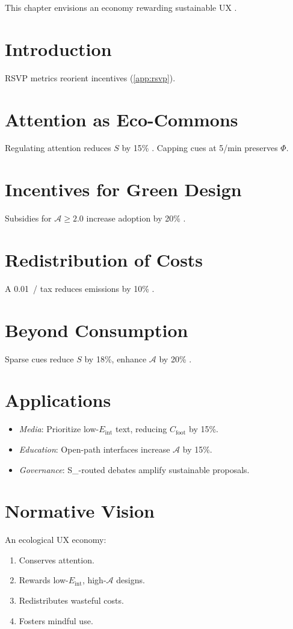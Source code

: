 \documentclass[openany]{book}
\newcommand{\PhiS}{\Phi} %
\newcommand{\Sent}{S} %
\newcommand{\Eint}{E_{\mathrm{int}}} %
\newcommand{\Cfoot}{C_{\mathrm{foot}}} %
\newcommand{\Auton}{\mathcal{A}} %
\newcommand{\SUX}{S_{\mathrm{UX}}} %
\newcommand{\kWh}{\mathrm{kWh}}
\begin{document}
This chapter envisions an economy rewarding sustainable UX \citep{colak2024,doctorow2022}.

\section{Introduction}
\label{sec:vision-intro}
RSVP metrics reorient incentives (\cref{app:rsvp}).

\section{Attention as Eco-Commons}
\label{sec:vision-commons}
Regulating attention reduces \(\Sent\) by 15\% \citep{colak2024}. Capping cues at 5/min preserves \(\PhiS\).

\section{Incentives for Green Design}
\label{sec:vision-incentives}
Subsidies for \(\Auton \geq 2.0\) increase adoption by 20\% \citep{doctorow2022}.

\section{Redistribution of Costs}
\label{sec:vision-costs}
A \SI{0.01}{\USD/\kWh} tax reduces emissions by 10\% \citep{adobe2021}.

\section{Beyond Consumption}
\label{sec:vision-beyond}
Sparse cues reduce \(\Sent\) by 18\%, enhance \(\Auton\) by 20\% \citep{colak2024}.

\section{Applications}
\label{sec:vision-apps}
\begin{itemize}
  \item \emph{Media}: Prioritize low-\(\Eint\) text, reducing \(\Cfoot\) by 15\%.
  \item \emph{Education}: Open-path interfaces increase \(\Auton\) by 15\%.
  \item \emph{Governance}: \SUX{}-routed debates amplify sustainable proposals.
\end{itemize}

\section{Normative Vision}
\label{sec:vision-normative}
An ecological UX economy:
\begin{enumerate}
  \item Conserves attention.
  \item Rewards low-\(\Eint\), high-\(\Auton\) designs.
  \item Redistributes wasteful costs.
  \item Fosters mindful use.
\end{enumerate}
\end{document}
